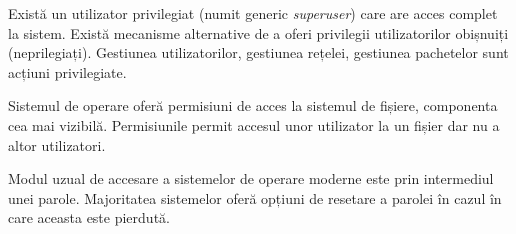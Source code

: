 Există un utilizator privilegiat (numit generic \textit{superuser}) care are acces complet la sistem. Există mecanisme alternative de a oferi privilegii utilizatorilor obișnuiți (neprilegiați). Gestiunea utilizatorilor, gestiunea rețelei, gestiunea pachetelor sunt acțiuni privilegiate.

Sistemul de operare oferă permisiuni de acces la sistemul de fișiere, componenta cea mai vizibilă. Permisiunile permit accesul unor utilizator la un fișier dar nu a altor utilizatori.

Modul uzual de accesare a sistemelor de operare moderne este prin intermediul unei parole. Majoritatea sistemelor oferă opțiuni de resetare a parolei în cazul în care aceasta este pierdută.
